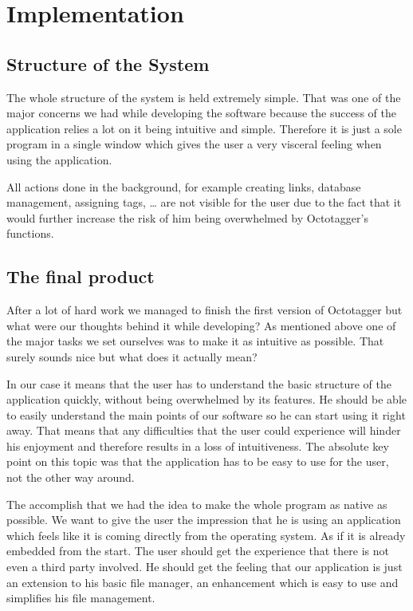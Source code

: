 \section{Implementation}
\def \kapitelautor {Christoph Führer}

\subsection{Structure of the System}
The whole structure of the system is held extremely simple. That was one of the major concerns we had while developing the software because the success of the application relies a lot on it being intuitive and simple. Therefore it is just a sole program in a single window which gives the user a very visceral feeling when using the application.

All actions done in the background, for example creating links, database management, assigning tags, \ldots{} are not visible for the user due to the fact that it would further increase the risk of him being overwhelmed by Octotagger's functions.

\subsection{The final product}
After a lot of hard work we managed to finish the first version of Octotagger but what were our thoughts behind it while developing? As mentioned above one of the major tasks we set ourselves was to make it as intuitive as possible. That surely sounds nice but what does it actually mean?

In our case it means that the user has to understand the basic structure of the application quickly, without being overwhelmed by its features. He should be able to easily understand the main points of our software so he can start using it right away. That means that any difficulties that the user could experience will hinder his enjoyment and therefore results in a loss of intuitiveness. The absolute key point on this topic was that the application has to be easy to use for the user, not the other way around.

The accomplish that we had the idea to make the whole program as native as possible. We want to give the user the impression that he is using an application which feels like it is coming directly from the operating system. As if it is already embedded from the start. The user should get the experience that there is not even a third party involved. He should get the feeling that our application is just an extension to his basic file manager, an enhancement which is easy to use and simplifies his file management.

